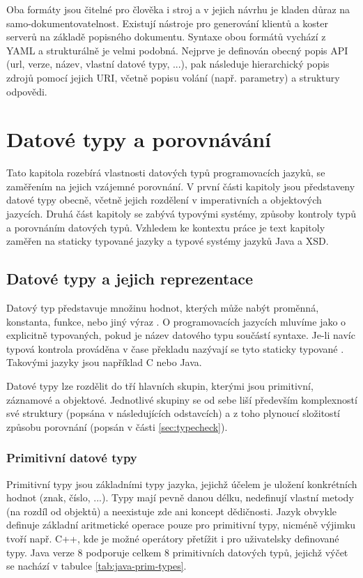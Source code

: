 \documentclass[czech,DP]{thesiskiv}
\begin{document}
Oba formáty jsou čitelné pro člověka i stroj a v jejich návrhu je kladen důraz na samo-dokumentovatelnost. Existují nástroje pro generování klientů a koster serverů na základě popisného dokumentu. Syntaxe obou formátů vychází z YAML a strukturálně je velmi podobná. Nejprve je definován obecný popis API (url, verze, název, vlastní datové typy, ...), pak následuje hierarchický popis zdrojů pomocí jejich URI, včetně popisu volání (např. parametry) a struktury odpovědi.
 
 
\chapter{Datové typy a porovnávání}
\label{cap:data-types}

Tato kapitola rozebírá vlastnosti datových typů programovacích jazyků, se zaměřením na jejich vzájemné porovnání. V první části kapitoly jsou představeny datové typy obecně, včetně jejich rozdělení v imperativních a objektových jazycích. Druhá část kapitoly se zabývá typovými systémy, způsoby kontroly typů a porovnáním datových typů. Vzhledem ke kontextu práce je text kapitoly zaměřen na staticky typované jazyky a typové systémy jazyků Java a XSD.

\section{Datové typy a jejich reprezentace}
\label{sec:data-types-repr}

Datový typ představuje množinu hodnot, kterých může nabýt proměnná, konstanta, funkce, nebo jiný výraz \cite{dataType}. O programovacích jazycích mluvíme jako o explicitně typovaných, pokud je název datového typu součástí syntaxe. Je-li navíc typová kontrola prováděna v čase překladu nazývají se tyto staticky typované \cite{cardelli2004}. Takovými jazyky jsou například C nebo Java.

Datové typy lze rozdělit do tří hlavních skupin, kterými jsou primitivní, záznamové a objektové. Jednotlivé skupiny se od sebe liší především komplexností své struktury (popsána v následujících odstavcích) a z toho plynoucí složitostí způsobu porovnání (popsán v části \ref{sec:typecheck}).
 
\subsection{Primitivní datové typy}
 
Primitivní typy jsou základními typy jazyka, jejichž účelem je uložení konkrétních hodnot (znak, číslo, ...). Typy mají pevně danou délku, nedefinují vlastní metody (na rozdíl od objektů) a neexistuje zde ani koncept dědičnosti. Jazyk obvykle definuje základní aritmetické operace pouze pro primitivní typy, nicméně výjimku tvoří např. C++, kde je možné operátory přetížit i pro uživatelsky definované typy. Java verze 8 podporuje celkem 8 primitivních datových typů, jejichž výčet se nachází v tabulce \ref{tab:java-prim-types}. 
 
\end{document}
